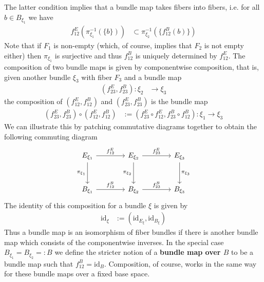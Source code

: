 The latter condition implies that a bundle map takes fibers into fibers, i.e. for all $b \in B_{\xi_{1}}$ we have
\begin{align*}
  f_{12}^{E}
  \left(
    \pi_{\xi_{1}}^{-1}
    \left(
      \lbrace b \rbrace
    \right)
  \right)
  &\subset
  \pi_{\xi_{2}}^{-1}
  \left(
    \lbrace f_{12}^{B}(b) \rbrace
  \right)
\end{align*}
Note that if $F_{1}$ is non-empty (which, of course, implies that $F_{2}$ is not empty either) then $\pi_{\xi_{1}}$ is surjective and thus $f_{12}^{B}$ is uniquely determined by $f_{12}^{E}$. The composition of two bundle maps is given by componentwise composition, that is, given another bundle $\xi_{3}$ with fiber $F_{3}$ and a bundle map
\begin{align*}
  (f_{23}^{E},f_{23}^{B})
  \colon
  \xi_{2}
  &\to
  \xi_{3}
\end{align*}
the composition of $(f_{12}^{E},f_{12}^{B})$ and $(f_{23}^{E},f_{23}^{B})$ is the bundle map
\begin{align*}
  (f_{23}^{E},f_{23}^{B})
  \circ
  (f_{12}^{E},f_{12}^{B})
  &:=
  \left(
    f_{23}^{E}\circ f_{12}^{E}
    ,
    f_{23}^{B} \circ f_{12}^{B}
  \right)
  \colon
  \xi_{1}
  \to
  \xi_{3}
\end{align*}
We can illustrate this by patching commutative diagrams together to obtain the following commuting diagram
\begin{equation*}
\begin{tikzcd}[row sep=3em,column sep=4em]
  E_{\xi_{1}}
  \ar{r}{f_{12}^{E}}
  \ar{d}[swap]{\pi_{\xi_{1}}}
  &
  E_{\xi_{2}}
  \ar{r}{f_{23}^{E}}
  \ar{d}[swap]{\pi_{\xi_{2}}}
  &
  E_{\xi_{3}}
  \ar{d}{\pi_{\xi_{3}}}
  \\
  B_{\xi_{1}}
  \ar{r}{f_{12}^{B}}
  &
  B_{\xi_{2}}
  \ar{r}{f_{23}^{B}}
  &
  B_{\xi_{3}}
\end{tikzcd}
\end{equation*}
The identity of this composition for a bundle $\xi$ is given by
\begin{align*}
  \mathrm{id}_{\xi}
  &:=
  \left(
    \mathrm{id}_{E_{\xi}}
    ,
    \mathrm{id}_{B_{\xi}}
  \right)
\end{align*}
Thus a bundle map is an isomorphism of fiber bundles if there is another bundle map which consists of the componentwise inverses. In the special case $B_{\xi_{1}} = B_{\xi_{2}} =: B$ we define the stricter notion of a \textbf{bundle map over $B$} to be a bundle map such that $f_{12}^{B} = \mathrm{id}_{B}$. Composition, of course, works in the same way for these bundle maps over a fixed base space.
